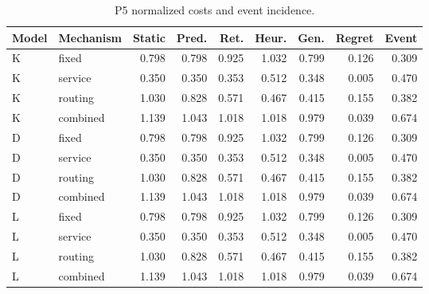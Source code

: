 \begin{table}[htbp]\caption{P5 normalized costs and event incidence.}\centering\small\setlength{\tabcolsep}{3pt}

\begin{tabular}{llrrrrrrr}\toprule

Model & Mechanism & Static & Pred. & Ret. & Heur. & Gen. & Regret & Event\\\midrule

K & fixed & 0.798 & 0.798 & 0.925 & 1.032 & 0.799 & 0.126 & 0.309\\

K & service & 0.350 & 0.350 & 0.353 & 0.512 & 0.348 & 0.005 & 0.470\\

K & routing & 1.030 & 0.828 & 0.571 & 0.467 & 0.415 & 0.155 & 0.382\\

K & combined & 1.139 & 1.043 & 1.018 & 1.018 & 0.979 & 0.039 & 0.674\\

D & fixed & 0.798 & 0.798 & 0.925 & 1.032 & 0.799 & 0.126 & 0.309\\

D & service & 0.350 & 0.350 & 0.353 & 0.512 & 0.348 & 0.005 & 0.470\\

D & routing & 1.030 & 0.828 & 0.571 & 0.467 & 0.415 & 0.155 & 0.382\\

D & combined & 1.139 & 1.043 & 1.018 & 1.018 & 0.979 & 0.039 & 0.674\\

L & fixed & 0.798 & 0.798 & 0.925 & 1.032 & 0.799 & 0.126 & 0.309\\

L & service & 0.350 & 0.350 & 0.353 & 0.512 & 0.348 & 0.005 & 0.470\\

L & routing & 1.030 & 0.828 & 0.571 & 0.467 & 0.415 & 0.155 & 0.382\\

L & combined & 1.139 & 1.043 & 1.018 & 1.018 & 0.979 & 0.039 & 0.674\\

\bottomrule\end{tabular}\end{table}

